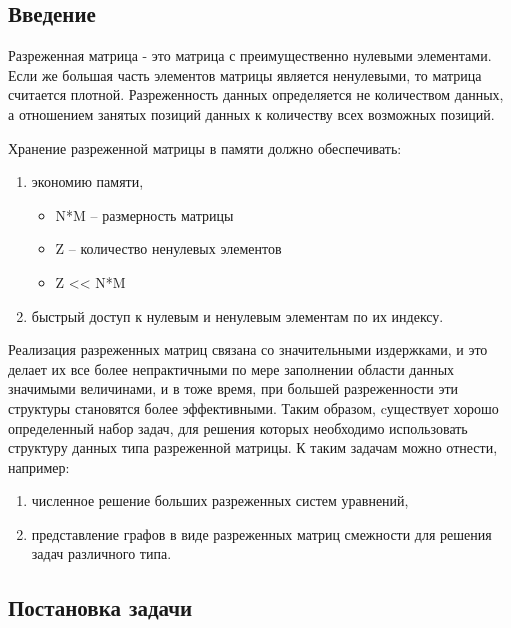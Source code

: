 \documentclass{report}
\begin{document}
\setcounter{page}{2}

\tableofcontents
\newpage

\begin{center}\section*{Введение}\end{center}
\par Разреженная матрица - это матрица с преимущественно нулевыми элементами. Если же большая часть элементов матрицы является ненулевыми, то матрица считается плотной. Разреженность данных определяется не количеством данных, а отношением занятых позиций  данных к количеству всех возможных позиций.
\par Хранение разреженной матрицы в памяти должно обеспечивать:
\begin{enumerate}
	\item экономию памяти,
	\begin{itemize}
		\item N*M – размерность матрицы
		\item Z – количество ненулевых элементов
		\item Z << N*M
	\end{itemize}
	\item быстрый доступ к нулевым и ненулевым элементам по их индексу.
\end{enumerate}
\par Реализация разреженных матриц связана со значительными издержками, и это делает их все более непрактичными по мере заполнении области данных значимыми величинами, и в тоже время, при большей разреженности эти структуры становятся более эффективными. Таким образом, cуществует хорошо определенный набор задач, для решения которых необходимо использовать  структуру данных типа разреженной матрицы. К таким задачам можно отнести, например:
\begin{enumerate} 
	\item численное решение больших разреженных систем уравнений,
	\item представление графов в виде разреженных матриц смежности для решения задач различного типа.
  \end{enumerate}
\newpage

\begin{center}\section*{Постановка задачи}\end{center}
\end{document}
